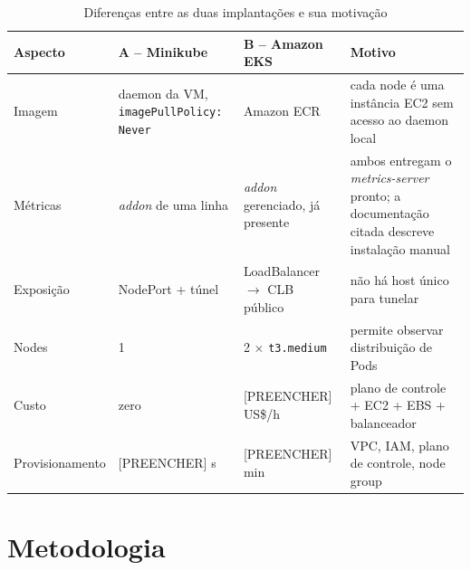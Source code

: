 \documentclass[12pt]{article}
\begin{document}
\begin{table}[ht]
\centering
\caption{Diferenças entre as duas implantações e sua motivação}
\label{tab:arquiteturas}
\begin{tabular}{@{}p{2.6cm}p{3.4cm}p{3.4cm}p{3.4cm}@{}}
\toprule
\textbf{Aspecto} & \textbf{A -- Minikube} & \textbf{B -- Amazon EKS} & \textbf{Motivo} \\
\midrule
Imagem & daemon da VM, \texttt{imagePullPolicy: Never} & Amazon ECR & cada node é uma instância EC2 sem acesso ao daemon local \\
Métricas & \textit{addon} de uma linha & \textit{addon} gerenciado, já presente & ambos entregam o \textit{metrics-server} pronto; a documentação citada descreve instalação manual \\
Exposição & NodePort + túnel & LoadBalancer $\rightarrow$ CLB público & não há host único para tunelar \\
Nodes & 1 & 2 $\times$ \texttt{t3.medium} & permite observar distribuição de Pods \\
Custo & zero & [PREENCHER] US\$/h & plano de controle + EC2 + EBS + balanceador \\
Provisionamento & [PREENCHER] s & [PREENCHER] min & VPC, IAM, plano de controle, node group \\
\bottomrule
\end{tabular}
\end{table}

\section{Metodologia}
\end{document}
